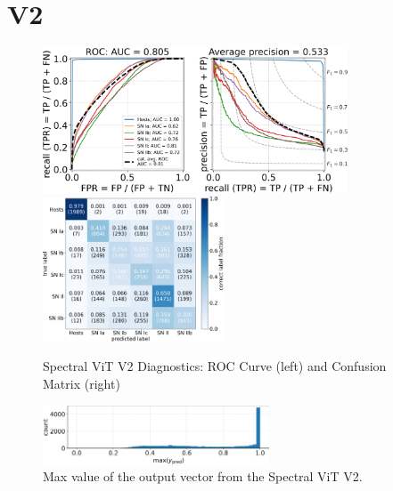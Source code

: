 \section{V2}

\begin{figure}[t]
    \centering
    \includegraphics[height=4.3cm]{figures/v2_real/vit_model_V2rocfulle_e26.png}
    \quad
    \includegraphics[height=4.3cm]{figures/v2_real/vit_model_V2cmfull_e26.png}
    \caption{Spectral ViT V2 Diagnostics: ROC Curve (left) and Confusion Matrix (right)\label{fig:v2_qual}}
\end{figure}

\begin{figure}[b]
    \centering
    \includegraphics[width=0.6\textwidth]{figures/v2_real/vit_model_V2max_ypred_26.png}
    \caption{Max value of the output vector from the Spectral ViT V2.\label{fig:v2_max}}
\end{figure}

